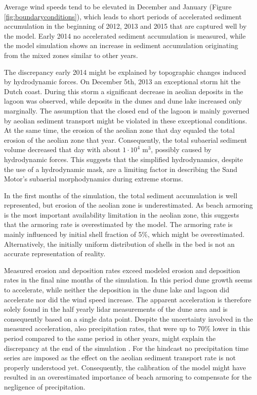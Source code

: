 Average wind speeds tend to be elevated in December and January
(Figure \ref{fig:boundaryconditions}), which leads to short periods of
accelerated sediment accumulation in the beginning of 2012, 2013 and
2015 that are captured well by the model. Early 2014 no accelerated
sediment accumulation is measured, while the model simulation shows an
increase in sediment accumulation originating from the mixed zones
similar to other years.

The discrepancy early 2014 might be explained by topographic changes
induced by hydrodynamic forces. On December 5th, 2013 an exceptional
storm hit the Dutch coast. During this storm a significant decrease in
aeolian deposits in the lagoon was observed, while deposits in the
dunes and dune lake increased only marginally. The assumption that the
closed end of the lagoon is mainly governed by aeolian sediment
transport might be violated in these exceptional conditions. At the
same time, the erosion of the aeolian zone that day equaled the total
erosion of the aeolian zone that year. Consequently, the total
subaerial sediment volume decreased that day with about
$\mathrm{1 \cdot 10^4}$ $\mathrm{m^3}$, possibly caused by
hydrodynamic forces. This suggests that the simplified hydrodynamics,
despite the use of a hydrodynamic mask, are a limiting factor in
describing the Sand Motor's subaerial morphodynamics during extreme
storms.

In the first months of the simulation, the total sediment accumulation
is well represented, but erosion of the aeolian zone is
underestimated. As beach armoring is the most important availability
limitation in the aeolian zone, this suggests that the armoring rate
is overestimated by the model. The armoring rate is mainly influenced
by initial shell fraction of 5\%, which might be
overestimated. Alternatively, the initially uniform distribution of
shells in the bed is not an accurate representation of reality.

Measured erosion and deposition rates exceed modeled erosion and
deposition rates in the final nine months of the simulation. In this
period dune growth seems to accelerate, while neither the deposition
in the dune lake and lagoon did accelerate nor did the wind speed
increase. The apparent acceleration is therefore solely found in the
half yearly lidar measurements of the dune area \citep{Hoonhout2017a}
and is consequently based on a single data point. Despite the
uncertainty involved in the measured acceleration, also precipitation
rates, that were up to 70\% lower in this period compared to the same
period in other years, might explain the discrepancy at the end of the
simulation \citep{Jackson1998}. For the hindcast no precipitation time
series are imposed as the effect on the aeolian sediment transport
rate is not properly understood yet. Consequently, the calibration of
the model might have resulted in an overestimated importance of beach
armoring to compensate for the negligence of precipitation.

